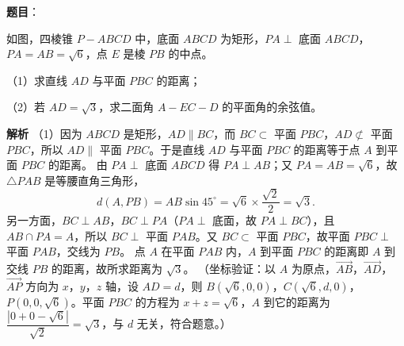 \begin{answer}

\textbf{题目}：

如图，四棱锥 $P-ABCD$ 中，底面 $ABCD$ 为矩形，$PA\perp$ 底面 $ABCD$，$PA=AB=\sqrt6$，点 $E$ 是棱 $PB$ 的中点。

（1）求直线 $AD$ 与平面 $PBC$ 的距离；

（2）若 $AD=\sqrt3$，求二面角 $A-EC-D$ 的平面角的余弦值。
\nopagebreak[4]
\begin{center}\end{center}
\nopagebreak[4]
\textbf{解析}
（1）因为 $ABCD$ 是矩形，$AD\parallel BC$，而 $BC\subset$ 平面 $PBC$，$AD\not\subset$ 平面 $PBC$，所以 $AD\parallel$ 平面 $PBC$。于是直线 $AD$ 与平面 $PBC$ 的距离等于点 $A$ 到平面 $PBC$ 的距离。
由 $PA\perp$ 底面 $ABCD$ 得 $PA\perp AB$；又 $PA=AB=\sqrt6$，故 $\triangle PAB$ 是等腰直角三角形，
\nopagebreak[4]
\[d\left(A,PB\right)=AB\sin45^\circ=\sqrt6\times\frac{\sqrt2}{2}=\sqrt3.\]
另一方面，$BC\perp AB$，$BC\perp PA$（$PA\perp$ 底面，故 $PA\perp BC$），且 $AB\cap PA=A$，所以 $BC\perp$ 平面 $PAB$。又 $BC\subset$ 平面 $PBC$，故平面 $PBC\perp$ 平面 $PAB$，交线为 $PB$。
点 $A$ 在平面 $PAB$ 内，$A$ 到平面 $PBC$ 的距离即 $A$ 到交线 $PB$ 的距离，故所求距离为 $\sqrt3$。
（坐标验证：以 $A$ 为原点，$\overrightarrow{AB}$，$\overrightarrow{AD}$，$\overrightarrow{AP}$ 方向为 $x$，$y$，$z$ 轴，设 $AD=d$，则 $B\left(\sqrt6,0,0\right)$，$C\left(\sqrt6,d,0\right)$，$P\left(0,0,\sqrt6\right)$。平面 $PBC$ 的方程为 $x+z=\sqrt6$，$A$ 到它的距离为 $\dfrac{\left|0+0-\sqrt6\right|}{\sqrt2}=\sqrt3$，与 $d$ 无关，符合题意。）


\end{answer}
